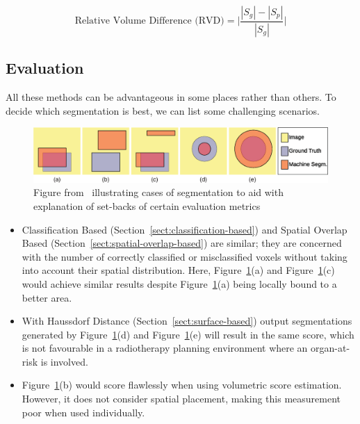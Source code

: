 \documentclass[11pt,twoside]{report}
\begin{document}
\begin{equation*}
 \text{Relative Volume Difference (RVD)} = \bigg| \frac{|S_g|-|S_p|}{|S_g|}\bigg|
\end{equation*}

\subsection{Evaluation}\label{sect:evaluation-of-evaluation-methods}

All these methods can be advantageous in some places rather than others. To decide which segmentation is best, we can list some challenging scenarios.

\begin{figure}[H]
  \centering
  \includegraphics[width=\linewidth]{../figures/segmentation-cases-1.png}
  \caption{Figure from~\cite{boundary-overlap-metrics} illustrating cases of segmentation to aid with explanation of set-backs of certain evaluation metrics}\label{fig:segmentation-cases-1}
\end{figure}

\begin{itemize}
  \item Classification Based (Section~\ref{sect:classification-based}) and Spatial Overlap Based (Section~\ref{sect:spatial-overlap-based}) are similar; they are concerned with the number of correctly classified or misclassified voxels without taking into account their spatial distribution. Here, Figure~\ref{fig:segmentation-cases-1}(a) and Figure~\ref{fig:segmentation-cases-1}(c) would achieve similar results despite Figure~\ref{fig:segmentation-cases-1}(a) being locally bound to a better area.
  \item With Haussdorf Distance (Section~\ref{sect:surface-based}) output segmentations generated by Figure~\ref{fig:segmentation-cases-1}(d) and Figure~\ref{fig:segmentation-cases-1}(e) will result in the same score, which is not favourable in a radiotherapy planning environment where an organ-at-risk is involved.
  \item Figure~\ref{fig:segmentation-cases-1}(b) would score flawlessly when using volumetric score estimation. However, it does not consider spatial placement, making this measurement poor when used individually.
\end{itemize}
\end{document}
